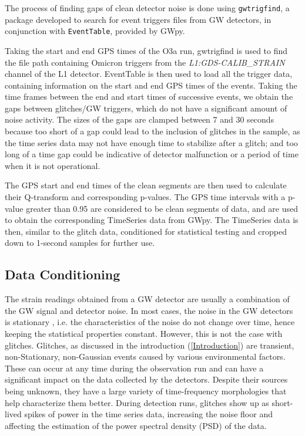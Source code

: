 \documentclass[12pt]{article}
\begin{document}
\noindent The process of finding gaps of clean detector noise is done using \texttt{gwtrigfind}, a package developed to search for event triggers files from GW detectors, in conjunction with \texttt{EventTable}, provided by GWpy.

\medskip
\noindent Taking the start and end GPS times of the O3a run, gwtrigfind is used to find the file path containing Omicron triggers from the \textit{L1:GDS-CALIB\_STRAIN} channel of the L1 detector. EventTable is then used to load all the trigger data, containing information on the start and end GPS times of the events. Taking the time frames between the end and start times of successive events, we obtain the gaps between glitches/GW triggers, which do not have a significant amount of noise activity. The sizes of the gaps are clamped between 7 and 30 seconds because too short of a gap could lead to the inclusion of glitches in the sample, as the time series data may not have enough time to stabilize after a glitch; and too long of a time gap could be indicative of detector malfunction or a period of time when it is not operational.

\medskip
\noindent The GPS start and end times of the clean segments are then used to calculate their Q-transform and corresponding p-values. The GPS time intervals with a p-value greater than 0.95 are considered to be clean segments of data, and are used to obtain the corresponding TimeSeries data from GWpy. The TimeSeries data is then, similar to the glitch data, conditioned for statistical testing and cropped down to 1-second samples for further use.


\subsection{Data Conditioning}

\noindent The strain readings obtained from a GW detector are usually a combination of the GW signal and detector noise. In most cases, the noise in the GW detectors is stationary \cite{collaboration_characterization_2016}, i.e. the characteristics of the noise do not change over time, hence keeping the statistical properties constant. However, this is not the case with glitches. Glitches, as discussed in the introduction (\ref{Introduction}) are transient, non-Stationary, non-Gaussian events caused by various environmental factors. These can occur at any time during the observation run and can have a significant impact on the data collected by the detectors. Despite their sources being unknown, they have a large variety of time-frequency morphologies that help characterize them better. During detection runs, glitches show up as short-lived spikes of power in the time series data, increasing the noise floor and affecting the estimation of the power spectral density (PSD) of the data.
\end{document}
